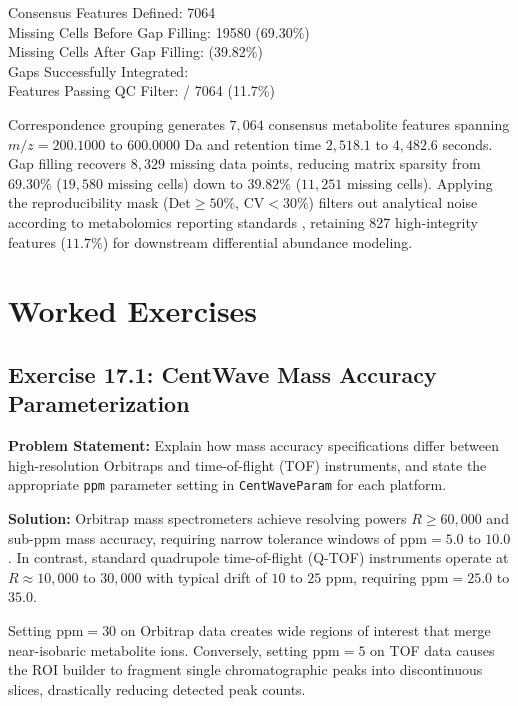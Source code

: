 \documentclass[11pt,twoside,openright]{book}
\begin{document}
\begin{routput}
Consensus Features Defined: 7064\\
Missing Cells Before Gap Filling: 19580 (69.30\%)\\
Missing Cells After Gap Filling:\enspace{} (39.82\%)\\
Gaps Successfully Integrated:\enspace\enspace{}\\[0.4em]
Features Passing QC Filter:\enspace\enspace\enspace\enspace\enspace\enspace{} / 7064 (11.7\%)
\end{routput}

Correspondence grouping generates $7{,}064$ consensus metabolite features spanning $m/z = 200.1000$ to $600.0000$ Da and retention time $2{,}518.1$ to $4{,}482.6$ seconds. Gap filling recovers $8{,}329$ missing data points, reducing matrix sparsity from $69.30\%$ ($19{,}580$ missing cells) down to $39.82\%$ ($11{,}251$ missing cells). Applying the reproducibility mask ($\text{Det} \ge 50\%$, $\text{CV} < 30\%$) filters out analytical noise according to metabolomics reporting standards \cite{broadhurst2018guidelines, dunn2011mass, sumner2007proposed}, retaining 827 high-integrity features ($11.7\%$) for downstream differential abundance modeling.

\FloatBarrier
\section{Worked Exercises}
\label{sec:worked_exercises}

\subsection*{Exercise 17.1: CentWave Mass Accuracy Parameterization}
\noindent\textbf{Problem Statement:}\enspace
Explain how mass accuracy specifications differ between high-resolution Orbitraps and time-of-flight (TOF) instruments, and state the appropriate \texttt{ppm} parameter setting in \texttt{CentWaveParam} for each platform.

\noindent\textbf{Solution:}\enspace
Orbitrap mass spectrometers achieve resolving powers $R \ge 60{,}000$ and sub-ppm mass accuracy, requiring narrow tolerance windows of $\text{ppm} = 5.0$ to $10.0$. In contrast, standard quadrupole time-of-flight (Q-TOF) instruments operate at $R \approx 10{,}000$ to $30{,}000$ with typical drift of $10$ to $25$ ppm, requiring $\text{ppm} = 25.0$ to $35.0$. 

Setting $\text{ppm} = 30$ on Orbitrap data creates wide regions of interest that merge near-isobaric metabolite ions. Conversely, setting $\text{ppm} = 5$ on TOF data causes the ROI builder to fragment single chromatographic peaks into discontinuous slices, drastically reducing detected peak counts.
\end{document}
